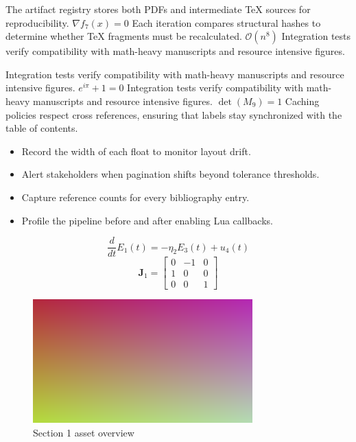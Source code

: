     The artifact registry stores both PDFs and intermediate TeX sources for reproducibility.  $\nabla f_{7}(x) = 0$  Each iteration compares structural hashes to determine whether TeX fragments must be recalculated.  $\mathcal{O}(n^{8})$  Integration tests verify compatibility with math-heavy manuscripts and resource intensive figures.
    \par
  
    Integration tests verify compatibility with math-heavy manuscripts and resource intensive figures.  $e^{i\pi} + 1 = 0$  Integration tests verify compatibility with math-heavy manuscripts and resource intensive figures.  $\det(M_{9}) = 1$  Caching policies respect cross references, ensuring that labels stay synchronized with the table of contents.
    \par
  
    \begin{itemize}
      
    \item Record the width of each float to monitor layout drift.
    \item Alert stakeholders when pagination shifts beyond tolerance thresholds.
    \item Capture reference counts for every bibliography entry.
    \item Profile the pipeline before and after enabling Lua callbacks.
    \end{itemize}
\begin{equation}
\label{eq:sec1-eq1}
\frac{d}{dt} E_{1}(t) = -\eta_{2} E_{3}(t) + u_{4}(t)
\end{equation}
\[
\mathbf{J}_{1} = \begin{bmatrix} 0 & -1 & 0 \\ 1 & 0 & 0 \\ 0 & 0 & 1 \end{bmatrix}
\]

    \begin{figure}[htbp]
      \centering
      
          \includegraphics[width=0.82\linewidth]{../assets/images/placeholder2.png}
        
        \caption{Section 1 asset overview}
      
        \label{fig:fig-sec1}
      
    \end{figure}
  
